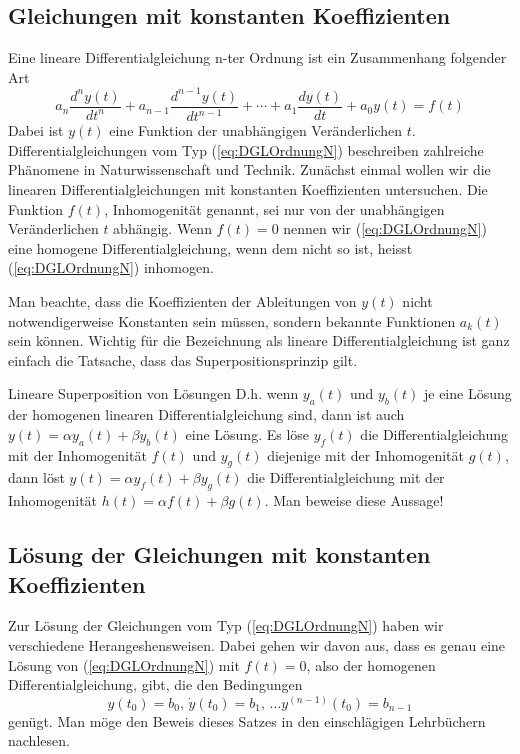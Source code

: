 \subsection{Gleichungen mit konstanten Koeffizienten}
Eine lineare Differentialgleichung n-ter Ordnung ist ein Zusammenhang folgender
Art
\begin{equation}\label{eq:DGLOrdnungN}
a_n\frac{d^n y(t)}{dt^n}+a_{n-1}\frac{d^{n-1} y(t)}{dt^{n-1}}+
\cdots +a_{1}\frac{d y(t)}{dt}+a_0y(t)=f(t)
\end{equation}
Dabei ist $y(t)$ eine Funktion der unabhängigen Veränderlichen $t$.
Differentialgleichungen vom Typ (\ref{eq:DGLOrdnungN}) beschreiben zahlreiche
Phänomene in Naturwissenschaft und Technik. Zunächst einmal wollen wir die
linearen Differentialgleichungen mit konstanten Koeffizienten untersuchen. Die
Funktion $f(t)$, Inhomogenität genannt, sei nur von der unabhängigen
Veränderlichen $t$ ab\-hängig. Wenn $f(t)=0$ nennen wir (\ref{eq:DGLOrdnungN})
eine homogene Differentialgleichung, wenn dem nicht so ist, heisst
(\ref{eq:DGLOrdnungN}) inhomogen.

Man beachte, dass die Koeffizienten der Ableitungen von $y(t)$ nicht
notwendigerweise Konstanten sein müssen, sondern bekannte Funktionen $a_k(t)$
sein können. Wichtig für die Bezeichnung als lineare Differentialgleichung ist
ganz einfach die Tatsache, dass das Superpositionsprinzip gilt. 
\begin{note}{Lineare Superposition von Lösungen}
D.h. wenn $y_a(t)$ und $y_b(t)$ je eine Lösung der homogenen linearen
Differentialgleichung sind, dann ist auch $y(t)=\alpha y_a(t) + \beta y_b(t)$
eine Lösung. Es löse $y_f(t)$ die Differentialgleichung mit der Inhomogenität
$f(t)$ und $y_g(t)$ diejenige mit der Inhomogenität $g(t)$, dann löst
$y(t)=\alpha y_f(t) + \beta y_g(t)$ die Differentialgleichung mit der
Inhomogenität $h(t)=\alpha f(t) + \beta g(t)$. Man beweise diese Aussage!
\end{note}
%
\subsection{Lösung der Gleichungen mit konstanten Koeffizienten}
Zur Lösung der Gleichungen vom Typ (\ref{eq:DGLOrdnungN}) haben wir
verschiedene Herangeshensweisen. Dabei gehen wir davon aus, dass es genau eine
Lösung von (\ref{eq:DGLOrdnungN}) mit $f(t)=0$, also der homogenen
Differentialgleichung, gibt, die den Bedingungen 
\begin{equation}
y(t_0)=b_0,\,\dot{y}(t_0)=b_1,\,\dots y^{(n-1)}(t_0)=b_{n-1}
  \label{eq:ICsGDGL}
\end{equation}
genügt. Man möge den Beweis dieses Satzes in den einschlägigen Lehrbüchern
nachlesen.
